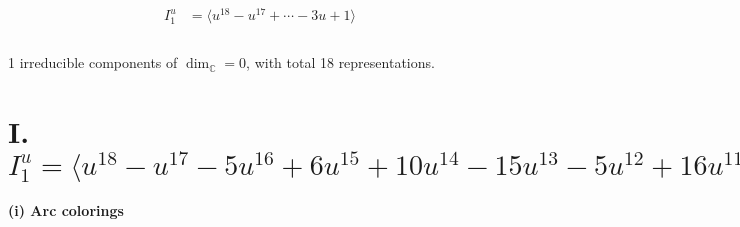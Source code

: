 \documentclass[1p]{elsarticle_modified}
\theoremstyle{definition}
\begin{document}
\begin{align*}
I^u_{1}&=\langle 
u^{18}- u^{17}+\cdots-3 u+1\rangle \\
\\
\end{align*}
\raggedright * 1 irreducible components of $\dim_{\mathbb{C}}=0$, with total 18 representations.\\
\newpage
\renewcommand{\arraystretch}{1}
\centering \section*{I. $I^u_{1}= \langle u^{18}- u^{17}-5 u^{16}+6 u^{15}+10 u^{14}-15 u^{13}-5 u^{12}+16 u^{11}-11 u^{10}+u^9+17 u^8-18 u^7-2 u^6+12 u^5-8 u^4+2 u^3+3 u^2-3 u+1 \rangle$}
\flushleft \textbf{(i) Arc colorings}\\
\end{document}
